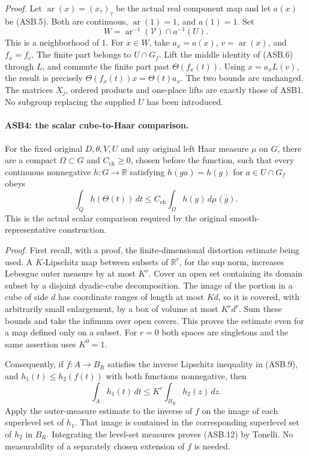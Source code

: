 \emph{Proof.}
Let \(\operatorname{ar}(x)=(x_\tau)_\tau\) be the actual real
component map and let \(a(x)\) be (ASB.5).
Both are continuous, \(\operatorname{ar}(1)=1\), and \(a(1)=1\).
Set
\[
 W=\operatorname{ar}^{-1}(\mathcal V)\cap a^{-1}(U).
 \tag{ASB.10}
\]
This is a neighborhood of \(1\).  For \(x\in W\), take
\(a_x=a(x)\), \(v=\operatorname{ar}(x)\), and \(f_x=f_v\).
The finite part belongs to \(U\cap G_f\).
Lift the middle identity of (ASB.6) through \(L\), and commute
the finite part past \(\Theta(f_x(t))\).  Using
\(x=a_xL(v)\), the result is precisely
\(\Theta(f_x(t))x=\Theta(t)a_x\).
The two bounds are unchanged.  The matrices \(X_j\), ordered
products and one-place lifts are exactly those of ASB1.
No subgroup replacing the supplied \(U\) has been introduced.

\paragraph{ASB4: the scalar cube-to-Haar comparison.}
\label{claim:ASB4}
For the fixed original \(D,\theta,V,U\) and any original left Haar
measure \(\mu\) on \(G\), there are a compact \(\Omega\subset G\)
and \(C_{\mathrm{ch}}\ge0\), chosen before the function, such that
every continuous nonnegative \(h:G\to\mathbb R\) satisfying
\(h(ga)=h(g)\) for \(a\in U\cap G_f\) obeys
\[
          \int_Q h(\Theta(t))\,dt
              \le C_{\mathrm{ch}}\int_\Omega h(g)\,d\mu(g).
 \tag{ASB.11}
\]
This is the actual scalar comparison required by the original
smooth-representative construction.

\emph{Proof.}
First recall, with a proof, the finite-dimensional distortion
estimate being used.  A \(K\)-Lipschitz map between subsets of
\(\mathbb R^r\), for the sup norm, increases Lebesgue outer
measure by at most \(K^r\).  Cover an open set containing its
domain subset by a disjoint dyadic-cube decomposition.  The image
of the portion in a cube of side \(d\) has coordinate ranges of
length at most \(Kd\), so it is covered, with arbitrarily small
enlargement, by a box of volume at most \(K^rd^r\).
Sum these bounds and take the infimum over open covers.
This proves the estimate even for a map defined only on a subset.
For \(r=0\) both spaces are singletons and the same assertion
uses \(K^0=1\).

Consequently, if \(f:A\to B_R\) satisfies the inverse Lipschitz
inequality in (ASB.9), and \(h_1(t)\le h_2(f(t))\) with both
functions nonnegative, then
\[
                   \int_A h_1(t)\,dt
                         \le K^r\int_{B_R}h_2(z)\,dz.
 \tag{ASB.12}
\]
Apply the outer-measure estimate to the inverse of \(f\) on the
image of each superlevel set of \(h_1\).  That image is contained
in the corresponding superlevel set of \(h_2\) in \(B_R\).
Integrating the level-set measures proves (ASB.12) by Tonelli.
No measurability of a separately chosen extension of \(f\) is
needed.

